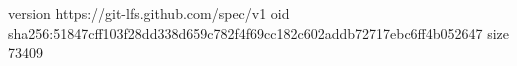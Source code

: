 version https://git-lfs.github.com/spec/v1
oid sha256:51847cff103f28dd338d659c782f4f69cc182c602addb72717ebc6ff4b052647
size 73409

